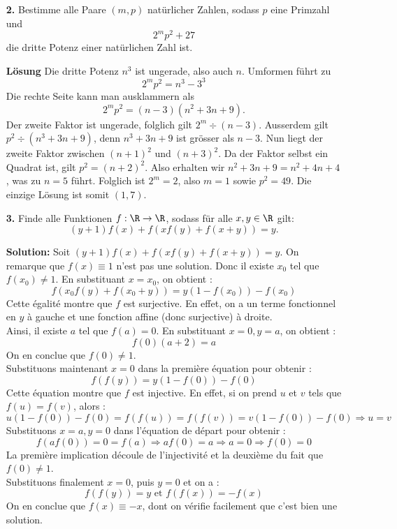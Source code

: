 \documentclass[language=german,style=solution]{smo}
\begin{document}
\begin{enumerate}
\newpage

\item[\textbf{2.}] Bestimme alle Paare $(m,p)$ natürlicher Zahlen, sodass $p$ eine Primzahl und
\[2^mp^2+27 \]
die dritte Potenz einer natürlichen Zahl ist.

\textbf{Lösung} Die dritte Potenz $n^3$ ist ungerade, also auch $n$. Umformen führt zu
\[
2^mp^2=n^3-3^3
\]
Die rechte Seite kann man ausklammern als
\[
2^mp^2=(n-3) (n^2+3n+9).
\]
Der zweite Faktor ist ungerade, folglich gilt $2^m \div (n-3)$. Ausserdem gilt $p^2 \div (n^3+3n+9)$, denn $n^3+3n+9$ ist grösser als $n-3$. Nun liegt der zweite Faktor zwischen $(n+1)^2$ und $(n+3)^2$. Da der Faktor selbst ein Quadrat ist, gilt $p^2=(n+2)^2$. Also erhalten wir $n^2+3n+9=n^2+4n+4$, was zu $n=5$ führt. Folglich ist $2^m=2$, also $m=1$ sowie $p^2=49$. Die einzige Lösung ist somit $(1,7)$.

\newpage

\item[\textbf{3.}] Finde alle Funktionen $f: \R \to \R$, sodass für alle $x,y \in \R$ gilt:
\[
(y+1)f(x) + f(xf(y)+f(x+y))=y.
\]

\textbf{Solution:} Soit $(y+1)f(x)+f(xf(y)+f(x+y))=y$.
On remarque que $f(x)\equiv 1$ n'est pas une solution. Donc il existe $x_0$ tel que $f(x_0)\neq 1$.
En substituant $x=x_0$, on obtient :
\[
	f(x_0f(y)+f(x_0+y))=y(1-f(x_0))-f(x_0)
\]
Cette égalité montre que $f$ est surjective. En effet, on a un terme fonctionnel en $y$ à gauche et une fonction affine (donc surjective) à droite.\\
Ainsi, il existe $a$ tel que $f(a)=0$. En substituant $x=0,y=a$, on obtient :
\[
	f(0)(a+2)=a
\]
On en conclue que $f(0)\neq 1$.\\
Substituons maintenant $x=0$ dans la première équation pour obtenir :
\[
	f(f(y))=y(1-f(0))-f(0)
\]
Cette équation montre que $f$ est injective. En effet, si on prend $u$ et $v$ tels que $f(u)=f(v)$, alors :
\[
	u(1-f(0))-f(0)=f(f(u))=f(f(v))=v(1-f(0))-f(0) \Rightarrow u=v
\]
Substituons $x=a,y=0$ dans l'équation de départ pour obtenir : 
\[
	f(af(0))=0=f(a) \Rightarrow af(0)=a \Rightarrow a=0 \Rightarrow f(0)=0
\]
La première implication découle de l'injectivité et la deuxième du fait que $f(0)\neq 1$.\\
Substituons finalement $x=0$, puis $y=0$ et on a :
\[
	f(f(y))=y \text{ et } f(f(x))=-f(x)
\]
On en conclue que $f(x)\equiv -x$, dont on vérifie facilement que c'est bien une solution.

\newpage


\end{enumerate}
\end{document}
